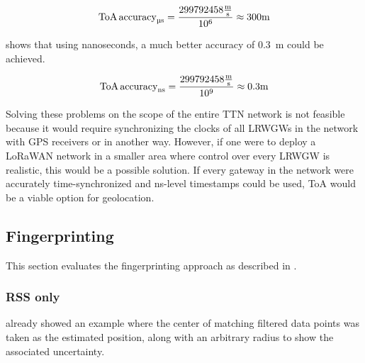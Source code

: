 \begin{equation}\label{eq:toa-accuracy-ttn-microseconds}
    \text{ToA\,accuracy}_{\si{\micro\second}} = \frac{299792458 \frac{\si{\meter}}{\si{\second}}}{10^6} \approx 300 \si{\meter}
\end{equation}

 shows that using nanoseconds, a much better accuracy of \SI{0.3}{\meter} could be achieved.

\begin{equation}\label{eq:toa-accuracy-ttn-nanoseconds}
    \text{ToA\,accuracy}_{\si{\nano\second}} = \frac{299792458 \frac{\si{\meter}}{\si{\second}}}{10^9} \approx 0.3 \si{\meter}
\end{equation}

Solving these problems on the scope of the entire \ac{TTN} network is not feasible because it would require synchronizing the clocks of all \aclp{LRWGW} in the network with \ac{GPS} receivers or in another way.
However, if one were to deploy a \ac{LoRaWAN} network in a smaller area where control over every \acl{LRWGW} is realistic, this would be a possible solution.
If every gateway in the network were accurately time-synchronized and \si{\nano\second}-level timestamps could be used, \ac{ToA} would be a viable option for geolocation.

\subsection{Fingerprinting}\label{subsec:conclusion-fingerprinting}

This section evaluates the fingerprinting approach as described in .

\subsubsection{\acl{RSS} only}

 already showed an example where the center of matching filtered data points was taken as the estimated position, along with an arbitrary radius to show the associated uncertainty.


